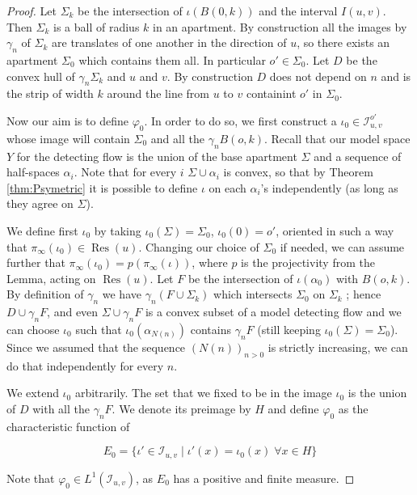 \documentclass[a4paper, 11pt]{article}
\theoremstyle{plain}
\theoremstyle{definition}
\theoremstyle{remark}
\DeclareMathOperator{\Res}{Res}
\newcommand{\IR}{\mathcal I}
\begin{document}
\begin{proof}
    Let $\Sigma_k$ be the intersection of  $\iota(B(0,k))$ and the interval $I(u,v)$. Then $\Sigma_k$ is a ball of radius $k$ in an apartment. By construction all the images by $\gamma_n$ of $\Sigma_k$ are translates of one another in the direction of $u$, so there exists an apartment $\Sigma_0$ which contains them all. In particular $o'\in \Sigma_0$.   Let $D$ be the convex hull of $\gamma_n \Sigma_k$ and $u$ and $v$. By construction $D$ does not depend on $n$ and is the strip of width $k$ around the line from $u$ to $v$ containint $o'$ in $\Sigma_0$. 

    Now our aim is to define $\varphi_0$. In order to do so, we first construct a $\iota_0\in \IR_{u,v}^{o'}$ whose image will contain $\Sigma_0$ and all the $\gamma_n B(o,k)$. Recall that our model space $Y$ for the detecting flow is the union of the base apartment $\Sigma$ and a sequence of half-spaces $\alpha_i$. Note that for every $i$ $\Sigma\cup\alpha_i$ is convex, so that by Theorem \ref{thm:Psymetric} it is possible to define $\iota$ on each $\alpha_i$'s independently (as long as they agree on $\Sigma$). 

    We define first $\iota_0$ by taking $\iota_0(\Sigma)=\Sigma_0$, $\iota_0(0)=o'$, oriented in such a way that $\pi_\infty(\iota_0)\in \Res(u)$. Changing our choice of $\Sigma_0$ if needed, we can assume further  that $\pi_\infty(\iota_0) = p(\pi_\infty(\iota))$, where $p$ is the projectivity from the Lemma, acting on $\Res(u)$. Let $F$ be the intersection of $\iota(\alpha_0)$ with $B(o,k)$. By definition of $\gamma_n$ we have $\gamma_n (F \cup \Sigma_k)$ which intersects $\Sigma_0$ on $\Sigma_k$ ; hence $D\cup \gamma_n F$, and even $\Sigma\cup \gamma_n F$ is a convex subset of a model detecting flow and we can choose $\iota_0$ such that $\iota_0(\alpha_{N(n)})$ contains $\gamma_n F$ (still keeping $\iota_0(\Sigma)=\Sigma_0$). Since we assumed that the sequence $(N(n))_{n>0}$ is strictly increasing, we can do that independently for every $n$. 

    We extend $\iota_0$ arbitrarily. The set that we fixed to be in the image $\iota_0$ is the union of $D$ with all the $\gamma_nF$. We denote its preimage by $H$ and define $\varphi_0$ as the characteristic function of 
    
    $$ E_0=\{\iota'\in \IR_{u,v} \mid \iota'(x)=\iota_0(x) \;\forall x\in H\}$$
    
    Note that $\varphi_0\in L^1(\IR_{u,v})$, as $E_0$ has a positive and finite measure.


\end{proof}
\end{document}
